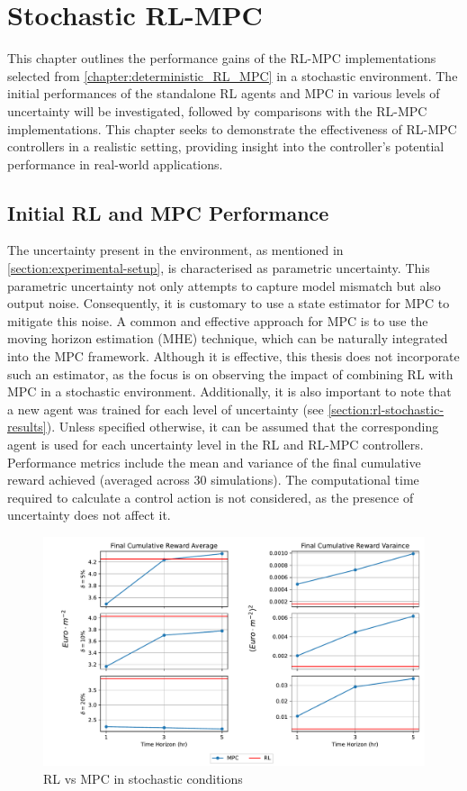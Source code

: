 \chapter{Stochastic RL-MPC}
\label{chapter:stochastic_RL_MPC}
This chapter outlines the performance gains of the RL-MPC implementations selected from \autoref{chapter:deterministic_RL_MPC} in a stochastic environment. The initial performances of the standalone RL agents and MPC in various levels of uncertainty will be investigated, followed by comparisons with the RL-MPC implementations. This chapter seeks to demonstrate the effectiveness of RL-MPC controllers in a realistic setting, providing insight into the controller’s potential performance in real-world applications.

\section{Initial RL and MPC Performance}
The uncertainty present in the environment, as mentioned in \autoref{section:experimental-setup}, is characterised as parametric uncertainty. This parametric uncertainty not only attempts to capture model mismatch but also output noise. Consequently, it is customary to use a state estimator for MPC to mitigate this noise. A common and effective approach for MPC is to use the moving horizon estimation (MHE) technique, which can be naturally integrated into the MPC framework. Although it is effective, this thesis does not incorporate such an estimator, as the focus is on observing the impact of combining RL with MPC in a stochastic environment. Additionally, it is also important to note that a new agent was trained for each level of uncertainty (see \autoref{section:rl-stochastic-results}). Unless specified otherwise, it can be assumed that the corresponding agent is used for each uncertainty level in the RL and RL-MPC controllers. Performance metrics include the mean and variance of the final cumulative reward achieved (averaged across 30 simulations). The computational time required to calculate a control action is not considered, as the presence of uncertainty does not affect it. 


\begin{figure}[H]
	\centering
	\includegraphics[width=\textwidth]{figures/stochastic_rl_vs_mpc.pdf}
	\caption{RL vs MPC in stochastic conditions}
	\label{fig:stochastic-rl-vs-mpc}
\end{figure}

